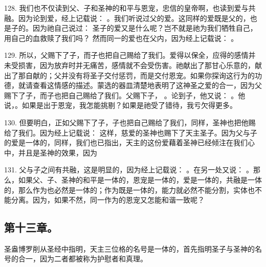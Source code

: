 128. 我们也不仅读到父、子和圣神的和平与恩宠，忠信的皇帝啊，也读到爱与共融。因为论到爱，经上记载说： 。我们听说过父的爱。这同样的爱既是父的，也是子的。因为祂自己说过：  圣子的爱又是什么呢？岂不就是祂为我们牺牲自己，用自己的血救赎了我们吗？ 然而同一的爱也在父内，因为经上记载说： 。\par

129. 所以，父赐下了子，而子也把自己赐给了我们。爱得以保全，应得的感情并未受损害，因为放弃时并无痛苦，感情就不会受伤害。祂献出了那甘心乐意的，献出了那自献的；父并没有将圣子交付惩罚，而是交付恩宠。如果你探询这行为的功德，就请查看这情感的描述。蒙选的器皿清楚地表明了这神圣之爱的合一，因为父赐下了子，而子也把自己赐给了我们。父赐下子， 。论到子，他又说： 。他说，。如果是出于恩宠，我怎能挑剔？如果是祂受了错待，我亏欠得更多。\par

130. 但要明白，正如父赐下了子，子也把自己赐给了我们，同样，圣神也把他赐给了我们。因为经上记载说： 这样，慈爱的圣神也赐下了天主圣子。因为父与子的爱是一体的，同样，我们也已指出，天主的这份爱藉着圣神已经倾注在我们心中，并且是圣神的效果，因为 \par

131. 父与子之间有共融，这是明显的，因为经上记载说： 。在另一处又说： 。那么，如果父、子、圣神的和平是一体的，恩宠是一体的，爱是一体的，共融是一体的，那么作为也必然是一体的；作为既是一体的，能力就必然不能分割，实体也不能分离。因为，如果不然，同一作为的恩宠又怎能和谐一致呢？\par


\subsection{第十三章。}

圣盎博罗削从圣经中指明，天主三位格的名号是一体的，首先指明圣子与圣神的名号的合一，因为二者都被称为护慰者和真理。\par

